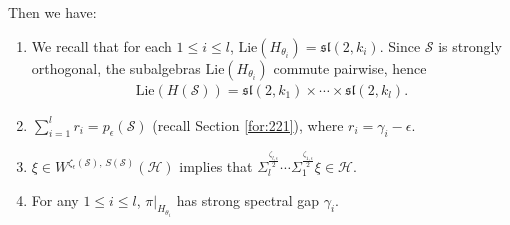 \documentclass[11 pt]{amsart}
\theoremstyle{definition}
\numberwithin{equation}{section}
\def\Lie{\mathrm{Lie}}
\begin{document}
Then we have:
\begin{enumerate}


  \item We recall that for each $1\leq i\leq l$,  $\text{Lie}(H_{\theta_i})=\mathfrak{sl}(2,k_i)$.  Since $\mathcal{S}$ is strongly orthogonal, the subalgebras $\Lie(H_{\theta_i})$ commute pairwise, hence
      \begin{align*}
       \text{Lie}(H(\mathcal{S}))=\mathfrak{sl}(2,k_1)\times\cdots \times \mathfrak{sl}(2,k_l).
      \end{align*}
 \item \(\sum_{i=1}^{l}r_i=p_{\epsilon}(\mathcal{S})\) (recall Section \ref{for:221}), where $r_i=\gamma_i-\epsilon$.
   \item\label{for:195} $\xi\in W^{\zeta_{\epsilon}(\mathcal{S}),\, S(\mathcal{S})}(\mathcal{H})$ implies that $\Sigma_l^{\frac{\zeta_{l,\epsilon}}{2}}\cdots \Sigma_1^{\frac{\zeta_{1,\epsilon}}{2}}\xi\in\mathcal{H}$.
   \item\label{for:200} For any $1\leq i\leq l$,
$\pi|_{H_{\theta_i}}$ has strong spectral gap $\gamma_{i}$.


\end{enumerate}
\end{document}
